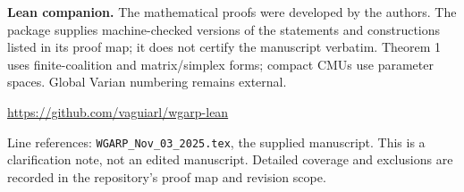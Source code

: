 \documentclass[11pt]{article}
\begin{document}
\textbf{Lean companion.}
The mathematical proofs were developed by the authors. The package supplies machine-checked versions of the statements and constructions listed in its proof map; it does not certify the manuscript verbatim. Theorem 1 uses finite-coalition and matrix/simplex forms; compact CMUs use parameter spaces. Global Varian numbering remains external.
\begin{center}\small
\url{https://github.com/vaguiarl/wgarp-lean}
\end{center}
{\footnotesize Line references: \texttt{WGARP\_Nov\_03\_2025.tex}, the supplied manuscript. This is a clarification note, not an edited manuscript. Detailed coverage and exclusions are recorded in the repository's proof map and revision scope.}
\end{document}

